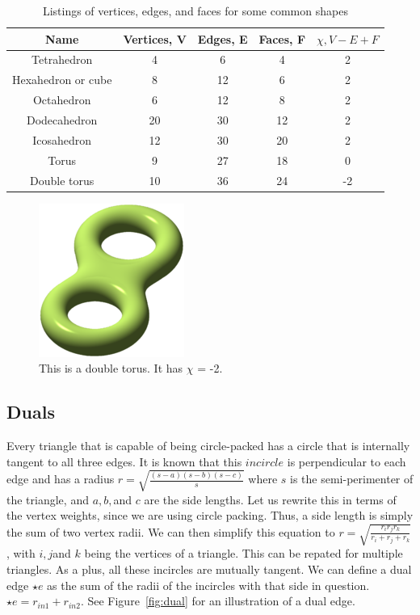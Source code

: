\documentclass[12pt]{article}
\begin{document}
\begin{table}
\begin{tabular}{ccccc}
Name  &	Vertices, V &	Edges, E & Faces, F &	$\chi, V - E + F$\\
\hline 
Tetrahedron &	4 &	6 &	4 &	2\\
Hexahedron or cube &	8 &	12 &	6 &	2\\
Octahedron 	&	6 &	12 &	8 & 2\\
Dodecahedron 	&	20 &	30 &	12 &	2\\
Icosahedron &	12 & 30 & 20 &	2\\
Torus & 9 & 27 & 18 & 0\\
Double torus & 10 & 36 & 24 & -2
\end{tabular}
\caption{Listings of vertices, edges, and faces for some common shapes \cite{wiki}}
\label{EuChar}
\end{table}

\begin{figure}
\centering
\includegraphics[scale = 2.0]{180px-Double_torus_illustration.png}
\caption{This is a double torus. It has $\chi$ = -2.} %
\label{test}
\end{figure}

\subsection{Duals}
\maketitle

Every triangle that is capable of being circle-packed has a circle that is internally tangent to all three edges. It is known that this $incircle$ is perpendicular to each edge and has a radius $\displaystyle r = \sqrt{\frac{(s-a)(s-b)(s-c)}{s}}$ where $s$ is the semi-perimenter of the triangle, and $a, b, $and $c$ are the side lengths. Let us rewrite this in terms of the vertex weights, since we are using circle packing. Thus, a side length is simply the sum of two vertex radii. We can then simplify this equation to $\displaystyle r = \sqrt{\frac{r_i r_j r_k}{r_i + r_j + r_k}}$, with $i, j $and $k$ being the vertices of a triangle. This can be repated for multiple triangles. As a plus, all these incircles are mutually tangent. We can define a dual edge $\star e$ as the sum of the radii of the incircles with that side in question. $\star e = r_{in1} + r_{in2}$. See Figure~\ref{fig:dual} for an illustration of a dual edge.\newline
\end{document}
